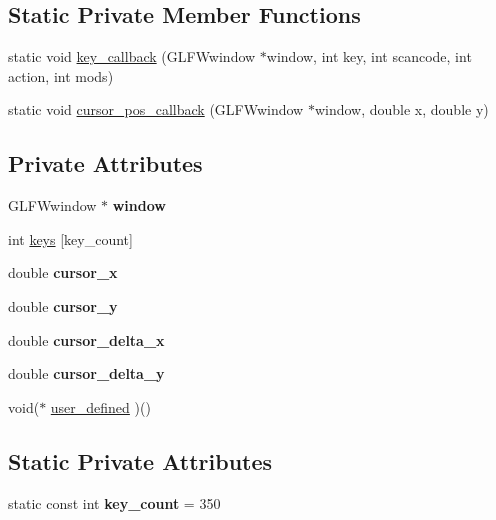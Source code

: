 \subsection*{Static Private Member Functions}
\begin{DoxyCompactItemize}
\item 
static void \mbox{\hyperlink{classagl_1_1Input_a32f796994b97888c46e5ad150a988370}{key\+\_\+callback}} (G\+L\+F\+Wwindow $\ast$window, int key, int scancode, int action, int mods)
\item 
static void \mbox{\hyperlink{classagl_1_1Input_a6273f37976797d2af6ffc3a004da75c9}{cursor\+\_\+pos\+\_\+callback}} (G\+L\+F\+Wwindow $\ast$window, double x, double y)
\end{DoxyCompactItemize}
\subsection*{Private Attributes}
\begin{DoxyCompactItemize}
\item 
\mbox{\label{classagl_1_1Input_adc2c65eb2dcb509dbc02c5890e32bc49}} 
G\+L\+F\+Wwindow $\ast$ {\bfseries window}
\item 
int \mbox{\hyperlink{classagl_1_1Input_a3d527e17ed44a940216ab7bd721b00a6}{keys}} \mbox{[}key\+\_\+count\mbox{]}
\item 
\mbox{\label{classagl_1_1Input_a0655a72660cddb3b3c86e2d667694714}} 
double {\bfseries cursor\+\_\+x}
\item 
\mbox{\label{classagl_1_1Input_a792eb7e70381fdd18b6334d035e0782b}} 
double {\bfseries cursor\+\_\+y}
\item 
\mbox{\label{classagl_1_1Input_aacd371856183d082364701a9285c4b8d}} 
double {\bfseries cursor\+\_\+delta\+\_\+x}
\item 
\mbox{\label{classagl_1_1Input_ac0a1863f27379ae6a643a4bc6ec43534}} 
double {\bfseries cursor\+\_\+delta\+\_\+y}
\item 
void($\ast$ \mbox{\hyperlink{classagl_1_1Input_a51bd4ac4cca730989ceef176786c9c38}{user\+\_\+defined}} )()
\end{DoxyCompactItemize}
\subsection*{Static Private Attributes}
\begin{DoxyCompactItemize}
\item 
\mbox{\label{classagl_1_1Input_ac3da3d5046f8ab566827f27a9086149c}} 
static const int {\bfseries key\+\_\+count} = 350
\end{DoxyCompactItemize}


